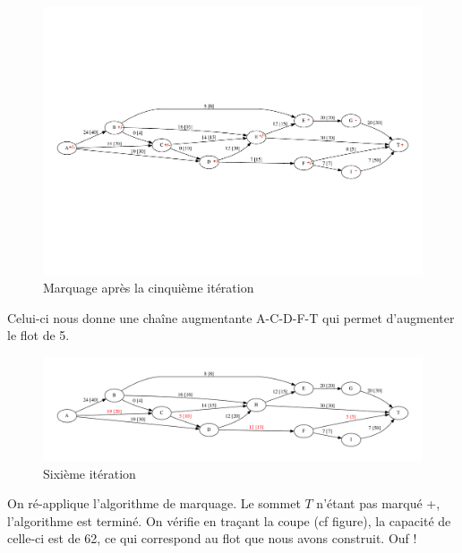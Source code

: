 \documentclass[paper=a4, fontsize=11pt]{scrartcl} %
\numberwithin{equation}{section} %
\numberwithin{figure}{section} %
\numberwithin{table}{section} %
\begin{document}
\begin{figure}[h]
\begin{center}
	\includegraphics[width=\textwidth]{figs/reseau-5m.pdf}
	\caption{Marquage après la cinquième itération}
	\label{fig:res:5m}
\end{center}
\end{figure}

Celui-ci nous donne une chaîne augmentante A-C-D-F-T qui permet d'augmenter le flot de 5.

\begin{figure}[h]
\begin{center}
	\includegraphics[width=\textwidth]{figs/reseau-6.pdf}
	\caption{Sixième itération}
	\label{fig:res:6}
\end{center}
\end{figure}

On ré-applique l'algorithme de marquage. Le sommet $T$ n'étant pas marqué +, l'algorithme est terminé. On vérifie en traçant la coupe (cf figure), la capacité de celle-ci est de 62, ce qui correspond au flot que nous avons construit. Ouf !
\end{document}
